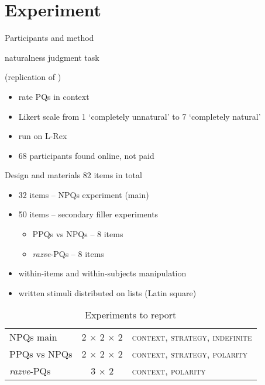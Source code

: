 \documentclass[xcolor=dvipsnames]{beamer}
\begin{document}
\section{Experiment}

\begin{frame}{Participants and method}
    \begin{large} naturalness judgment task \end{large} (replication of \citealp{Stankova2023})
    \begin{itemize}
        \item rate PQs in context 
        \item Likert scale from 1 `completely unnatural' to 7 `completely natural'
        \item run on L-Rex \citep{Lrex}
        \item 68 participants found online, not paid  
    \end{itemize}

\end{frame}

\begin{frame}{Design and materials}
    82 items in total 
    \begin{itemize}
        \item 32 items -- NPQs experiment (main)
        \item 50 items -- secondary filler experiments
        \begin{itemize}
            \item PPQs vs NPQs -- 8 items 
        \item \textit{razve}-PQs -- 8 items 
        \end{itemize}
        \item within-items and within-subjects manipulation
        \item written stimuli distributed on lists (Latin square)
    \end{itemize}
    \begin{table}[h]
        \centering
        \begin{tabular}{lcl}
            \toprule
            NPQs main & 2 $\times$ 2 $\times$ 2 & \textsc{context, strategy, indefinite} \\
            PPQs vs NPQs & 2 $\times$ 2 $\times$ 2 & \textsc{context, strategy, polarity} \\
            \textit{razve}-PQs & 3 $\times$ 2 & \textsc{context, polarity} \\
            \bottomrule
        \end{tabular}
        \caption{Experiments to report}
        \label{tab:ex1_main}
    \end{table}


\end{frame}
\end{document}

